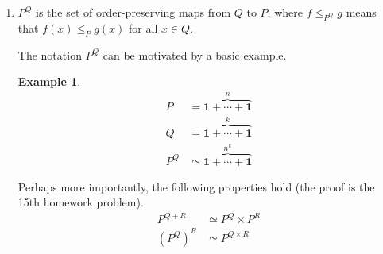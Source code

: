 \documentclass[11pt]{article}
\newtheorem{example}[theorem]{Example}
\newenvironment{proof}{\noindent \textbf{Proof:}}{$\Box$}
\newcommand{\intposet}[1]{{\mathbf{#1}}}
\begin{document}
\begin{enumerate}
The Hasse diagram of $P \times Q$ is the Cartesian product of the Hasse diagrams
of $P$ and $Q$.
\begin{example}
    $B_n \simeq \underbrace{\intposet{2} \times \cdots \times \intposet{2}}_{n \text{ times}}$
\end{example}
\begin{proof}
    Define a candidate isomorphism
    \begin{align*}
        f: \intposet{2} \times \cdots \times \intposet{2} &\to B_n \\
            (b_1, \cdots, b_n) &\mapsto \left\{ i \in [n] \mid b_i = 2 \right\} .
    \end{align*}
    It's easy to show that $f$ is bijective. To check that $f$ and $f^{-1}$
    are order-preserving, just observe that each of the following conditions
    is equivalent to the ones that come before and after it.
    \begin{itemize}
        \item $(b_1,\cdots,b_n) \leq (b_1', \cdots, b_n')$
        \item $b_i \leq b_i'$ for all $i$
        \item $\{ i \mid b_i = 2 \} \subseteq \{ i \mid b_i' = 2 \}$
        \item $f((b_1,\cdots,b_n)) \leq f((b_1',\cdots,b_n'))$
    \end{itemize}
\end{proof}
\begin{example}
    \label{lecturesevendistinctprimes}
    If $k = p_1 \cdots p_n$ is a product of $n$ distinct primes,
    then $D_k \simeq B_n$.
\end{example}
The proof of Example \ref{lecturesevendistinctprimes} is similarly easy,
using the isomorphism $f: D_k \to B_n$ defined by $\prod_{i \in S} p_i \mapsto S$.
\item
$P^Q$ is the set of order-preserving maps from $Q$ to $P$,
where $f \leq_{P^Q} g$ means that $f(x) \leq_P g(x)$ for all $x \in Q$.

The notation $P^Q$ can be motivated by a basic example.
\begin{example}
\begin{align*}
    P &= \overbrace{\intposet{1} + \cdots + \intposet{1}}^n \\
    Q &= \overbrace{\intposet{1} + \cdots + \intposet{1}}^k \\
    P^Q &\simeq \overbrace{\intposet{1} + \cdots + \intposet{1}}^{n^k}
\end{align*}
\end{example}
Perhaps more importantly, the following properties hold
(the proof is the 15th homework problem).
\begin{align*}
    P^{Q + R} &\simeq P^Q \times P^R \\
    \left(P^Q\right)^R &\simeq P^{Q \times R}
\end{align*}


\end{enumerate}
\end{document}
